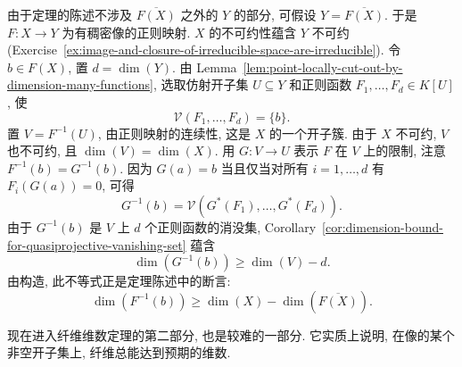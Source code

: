 \begingroup
\renewcommand{\AJProofBegin}{%
  \par\addvspace{\topsep}\noindent
  {\sffamily\bfseries\CJKfamily{pffont}Proof of Theorem~\ref{thm:fiber-dimension-lower-bound}}\enspace\ignorespaces
}
\begin{Proof}
由于定理的陈述不涉及 $\overline{F(X)}$ 之外的 $Y$ 的部分, 可假设 $Y=\overline{F(X)}$. 于是 $F:X\to Y$ 为有稠密像的正则映射. $X$ 的不可约性蕴含 $Y$ 不可约 (Exercise~\ref{ex:image-and-closure-of-irreducible-space-are-irreducible}). 令 $b\in F(X)$, 置 $d=\dim(Y)$. 由 Lemma~\ref{lem:point-locally-cut-out-by-dimension-many-functions}, 选取仿射开子集 $U\subseteq Y$ 和正则函数 $F_{1},\ldots,F_{d}\in K[U]$, 使
\[
  \mathcal{V}(F_{1},\ldots,F_{d})=\{b\}.
\]
置 $V=F^{-1}(U)$, 由正则映射的连续性, 这是 $X$ 的一个开子簇. 由于 $X$ 不可约, $V$ 也不可约, 且 $\dim(V)=\dim(X)$. 用 $G:V\to U$ 表示 $F$ 在 $V$ 上的限制, 注意 $F^{-1}(b)=G^{-1}(b)$. 因为 $G(a)=b$ 当且仅当对所有 $i=1,\ldots,d$ 有 $F_{i}(G(a))=0$, 可得
\[
  G^{-1}(b)=\mathcal{V}(G^{*}(F_{1}),\ldots,G^{*}(F_{d})).
\]
由于 $G^{-1}(b)$ 是 $V$ 上 $d$ 个正则函数的消没集, Corollary~\ref{cor:dimension-bound-for-quasiprojective-vanishing-set} 蕴含
\[
  \dim(G^{-1}(b))\ge\dim(V)-d.
\]
由构造, 此不等式正是定理陈述中的断言:
\[
  \dim(F^{-1}(b))\ge\dim(X)-\dim(\overline{F(X)}).
\]
\end{Proof}
\endgroup

现在进入纤维维数定理的第二部分, 也是较难的一部分. 它实质上说明, 在像的某个非空开子集上, 纤维总能达到预期的维数.

